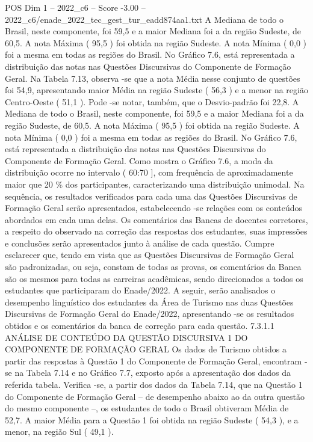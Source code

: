 \begin{textsample}{POS Dim 1 – 2022\_c6 – Score -3.00 – 2022\_c6/enade\_2022\_tec\_gest\_tur\_eadd874aa1.txt}
A Mediana de todo o Brasil, neste componente, foi 59,5 e a maior Mediana foi a da região Sudeste, de 60,5.
A nota Máxima ( 95,5 ) foi obtida na região Sudeste.
A nota Mínima ( 0,0 ) foi a mesma em todas as regiões do Brasil.
No Gráfico 7.6, está representada a distribuição das notas nas Questões Discursivas do Componente de Formação Geral.
Na Tabela 7.13, observa -se que a nota Média nesse conjunto de questões foi 54,9, apresentando maior Média na região Sudeste ( 56,3 ) e a menor na região Centro-Oeste ( 51,1 ).
Pode -se notar, também, que o Desvio-padrão foi 22,8.
A Mediana de todo o Brasil, neste componente, foi 59,5 e a maior Mediana foi a da região Sudeste, de 60,5.
A nota Máxima ( 95,5 ) foi obtida na região Sudeste.
A nota Mínima ( 0,0 ) foi a mesma em todas as regiões do Brasil.
No Gráfico 7.6, está representada a distribuição das notas nas Questões Discursivas do Componente de Formação Geral.
Como mostra o Gráfico 7.6, a moda da distribuição ocorre no intervalo ( 60:70 ], com frequência de aproximadamente maior que 20 \% dos participantes, caracterizando uma distribuição unimodal.
Na sequência, os resultados verificados para cada uma das Questões Discursivas de Formação Geral serão apresentados, estabelecendo -se relações com os conteúdos abordados em cada uma delas.
Os comentários das Bancas de docentes corretores, a respeito do observado na correção das respostas dos estudantes, suas impressões e conclusões serão apresentados junto à análise de cada questão.
Cumpre esclarecer que, tendo em vista que as Questões Discursivas de Formação Geral são padronizadas, ou seja, constam de todas as provas, os comentários da Banca são os mesmos para todas as carreiras acadêmicas, sendo direcionados a todos os estudantes que participaram do Enade/2022.
A seguir, serão analisados o desempenho linguístico dos estudantes da Área de Turismo nas duas Questões Discursivas de Formação Geral do Enade/2022, apresentando -se os resultados obtidos e os comentários da banca de correção para cada questão. 7.3.1.1 ANÁLISE DE CONTEÚDO DA QUESTÃO DISCURSIVA 1 DO COMPONENTE DE FORMAÇÃO GERAL Os dados de Turismo obtidos a partir das respostas à Questão 1 do Componente de Formação Geral, encontram -se na Tabela 7.14 e no Gráfico 7.7, exposto após a apresentação dos dados da referida tabela.
Verifica -se, a partir dos dados da Tabela 7.14, que na Questão 1 do Componente de Formação Geral – de desempenho abaixo ao da outra questão do mesmo componente –, os estudantes de todo o Brasil obtiveram Média de 52,7.
A maior Média para a Questão 1 foi obtida na região Sudeste ( 54,3 ), e a menor, na região Sul ( 49,1 ).

\end{textsample}

